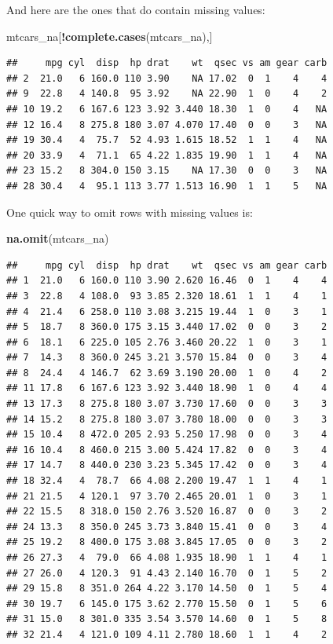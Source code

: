 \documentclass[]{book}
\newenvironment{Shaded}{\begin{snugshade}}{\end{snugshade}}
\newcommand{\KeywordTok}[1]{\textcolor[rgb]{0.13,0.29,0.53}{\textbf{#1}}}
\newcommand{\OperatorTok}[1]{\textcolor[rgb]{0.81,0.36,0.00}{\textbf{#1}}}
\newcommand{\NormalTok}[1]{#1}
\begin{document}
And here are the ones that do contain missing values:

\begin{Shaded}
\begin{Highlighting}[]
\NormalTok{mtcars_na[}\OperatorTok{!}\KeywordTok{complete.cases}\NormalTok{(mtcars_na),]}
\end{Highlighting}
\end{Shaded}

\begin{verbatim}
##     mpg cyl  disp  hp drat    wt  qsec vs am gear carb
## 2  21.0   6 160.0 110 3.90    NA 17.02  0  1    4    4
## 9  22.8   4 140.8  95 3.92    NA 22.90  1  0    4    2
## 10 19.2   6 167.6 123 3.92 3.440 18.30  1  0    4   NA
## 12 16.4   8 275.8 180 3.07 4.070 17.40  0  0    3   NA
## 19 30.4   4  75.7  52 4.93 1.615 18.52  1  1    4   NA
## 20 33.9   4  71.1  65 4.22 1.835 19.90  1  1    4   NA
## 23 15.2   8 304.0 150 3.15    NA 17.30  0  0    3   NA
## 28 30.4   4  95.1 113 3.77 1.513 16.90  1  1    5   NA
\end{verbatim}

One quick way to omit rows with missing values is:

\begin{Shaded}
\begin{Highlighting}[]
\KeywordTok{na.omit}\NormalTok{(mtcars_na)}
\end{Highlighting}
\end{Shaded}

\begin{verbatim}
##     mpg cyl  disp  hp drat    wt  qsec vs am gear carb
## 1  21.0   6 160.0 110 3.90 2.620 16.46  0  1    4    4
## 3  22.8   4 108.0  93 3.85 2.320 18.61  1  1    4    1
## 4  21.4   6 258.0 110 3.08 3.215 19.44  1  0    3    1
## 5  18.7   8 360.0 175 3.15 3.440 17.02  0  0    3    2
## 6  18.1   6 225.0 105 2.76 3.460 20.22  1  0    3    1
## 7  14.3   8 360.0 245 3.21 3.570 15.84  0  0    3    4
## 8  24.4   4 146.7  62 3.69 3.190 20.00  1  0    4    2
## 11 17.8   6 167.6 123 3.92 3.440 18.90  1  0    4    4
## 13 17.3   8 275.8 180 3.07 3.730 17.60  0  0    3    3
## 14 15.2   8 275.8 180 3.07 3.780 18.00  0  0    3    3
## 15 10.4   8 472.0 205 2.93 5.250 17.98  0  0    3    4
## 16 10.4   8 460.0 215 3.00 5.424 17.82  0  0    3    4
## 17 14.7   8 440.0 230 3.23 5.345 17.42  0  0    3    4
## 18 32.4   4  78.7  66 4.08 2.200 19.47  1  1    4    1
## 21 21.5   4 120.1  97 3.70 2.465 20.01  1  0    3    1
## 22 15.5   8 318.0 150 2.76 3.520 16.87  0  0    3    2
## 24 13.3   8 350.0 245 3.73 3.840 15.41  0  0    3    4
## 25 19.2   8 400.0 175 3.08 3.845 17.05  0  0    3    2
## 26 27.3   4  79.0  66 4.08 1.935 18.90  1  1    4    1
## 27 26.0   4 120.3  91 4.43 2.140 16.70  0  1    5    2
## 29 15.8   8 351.0 264 4.22 3.170 14.50  0  1    5    4
## 30 19.7   6 145.0 175 3.62 2.770 15.50  0  1    5    6
## 31 15.0   8 301.0 335 3.54 3.570 14.60  0  1    5    8
## 32 21.4   4 121.0 109 4.11 2.780 18.60  1  1    4    2
\end{verbatim}
\end{document}
